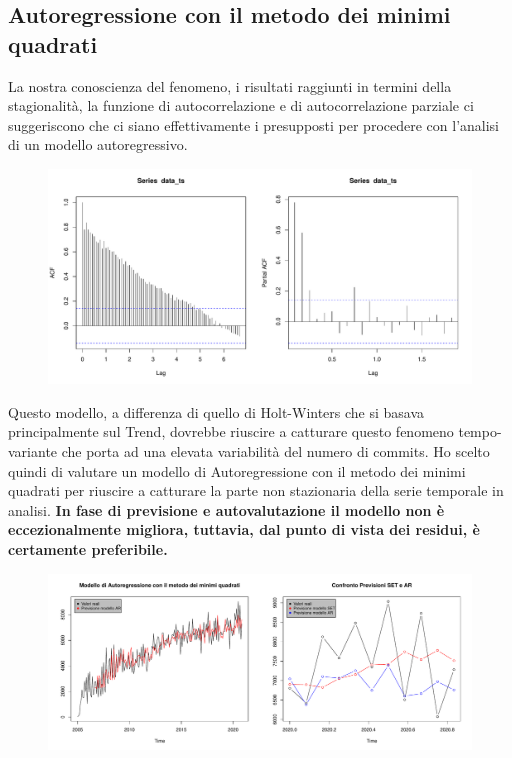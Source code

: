 \documentclass[11pt,a4paper]{article}
\begin{document}
\subsection{Autoregressione con il metodo dei minimi quadrati}
La nostra conoscienza del fenomeno, i risultati raggiunti in termini della
stagionalit\`a, la funzione di autocorrelazione e di autocorrelazione parziale
ci suggeriscono che ci siano effettivamente i presupposti per procedere con
l'analisi di un modello autoregressivo.
\begin{figure}[H]
	\vspace{-0.3cm}
	\hspace{-1.5cm}
	\includegraphics[scale=0.57]{imgs/acf_pacf.pdf}
	\vspace{-1.0cm}
\end{figure}
\noindent
Questo modello, a differenza di quello di Holt-Winters che si basava
principalmente sul Trend, dovrebbe riuscire a catturare questo fenomeno
tempo-variante che porta ad una elevata variabilit\`a del numero di commits. Ho
scelto quindi di valutare un modello di Autoregressione con il metodo dei minimi
quadrati per riuscire a catturare la parte non stazionaria della serie temporale
in analisi. \textbf{In fase di previsione e autovalutazione il modello non \`e
eccezionalmente migliora, tuttavia, dal punto di vista dei residui, \`e
certamente preferibile.}
\begin{figure}[H]
	\vspace{-1.7cm}
	\hspace{-3.0cm}
	\includegraphics[scale=0.56]{imgs/AR_plot_test.pdf}
	\vspace{-0.9cm}
\end{figure}
\end{document}
